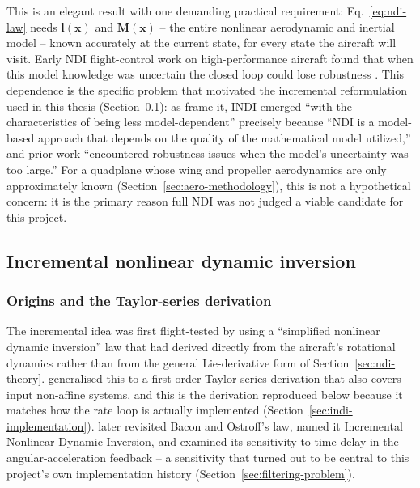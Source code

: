 \documentclass{article}
\begin{document}
This is an elegant result with one demanding practical requirement: Eq.~\eqref{eq:ndi-law} needs $\mathbf{l}(\mathbf{x})$ and $\mathbf{M}(\mathbf{x})$ -- the entire nonlinear aerodynamic and inertial model -- known accurately at the current state, for every state the aircraft will visit. Early NDI flight-control work on high-performance aircraft found that when this model knowledge was uncertain the closed loop could lose robustness \citep{snell1992,buffington1999}. This dependence is the specific problem that motivated the incremental reformulation used in this thesis (Section~\ref{sec:indi-theory}): as \citet{steinertPart1_2025} frame it, INDI emerged ``with the characteristics of being less model-dependent'' precisely because ``NDI is a model-based approach that depends on the quality of the mathematical model utilized,'' and prior work ``encountered robustness issues when the model's uncertainty was too large.'' For a quadplane whose wing and propeller aerodynamics are only approximately known (Section~\ref{sec:aero-methodology}), this is not a hypothetical concern: it is the primary reason full NDI was not judged a viable candidate for this project.

\subsection{Incremental nonlinear dynamic inversion}
\label{sec:indi-theory}

\subsubsection{Origins and the Taylor-series derivation}
The incremental idea was first flight-tested by \citet{smithberry2000} using a ``simplified nonlinear dynamic inversion'' law that \citet{smith1998} had derived directly from the aircraft's rotational dynamics rather than from the general Lie-derivative form of Section~\ref{sec:ndi-theory}. \citet{bacon2000} generalised this to a first-order Taylor-series derivation that also covers input non-affine systems, and this is the derivation reproduced below because it matches how the rate loop is actually implemented (Section~\ref{sec:indi-implementation}). \citet{sieberling2010} later revisited Bacon and Ostroff's law, named it Incremental Nonlinear Dynamic Inversion, and examined its sensitivity to time delay in the angular-acceleration feedback -- a sensitivity that turned out to be central to this project's own implementation history (Section~\ref{sec:filtering-problem}).
\end{document}
